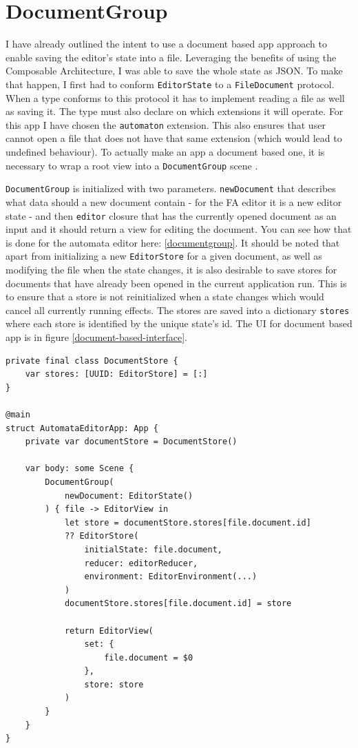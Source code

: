 \section{DocumentGroup}

I have already outlined the intent to use a document based app approach to enable saving the editor's state into a file. Leveraging the benefits of using the Composable Architecture, I was able to save the whole state as JSON. To make that happen, I first had to conform \lstinline{EditorState} to a \lstinline{FileDocument} protocol. When a type conforms to this protocol it has to implement reading a file as well as saving it. The type must also declare on which extensions it will operate. For this app I have chosen the \lstinline{automaton} extension. This also ensures that user cannot open a file that does not have that same extension (which would lead to undefined behaviour). To actually make an app a document based one, it is necessary to wrap a root view into a \lstinline{DocumentGroup} scene \cite{documentgroup}. 

\lstinline{DocumentGroup} is initialized with two parameters. \lstinline{newDocument} that describes what data should a new document contain - for the FA editor it is a new editor state - and then \lstinline{editor} closure that has the currently opened document as an input and it should return a view for editing the document. You can see how that is done for the automata editor here: \ref{documentgroup}. It should be noted that apart from initializing a new \lstinline{EditorStore} for a given document, as well as modifying the file when the state changes, it is also desirable to save stores for documents that have already been opened in the current application run. This is to ensure that a store is not reinitialized when a state changes which would cancel all currently running effects. The stores are saved into a dictionary \lstinline{stores} where each store is identified by the unique state's id. The UI for document based app is in figure \ref{document-based-interface}.

\begin{lstlisting}[caption={DocumentGroup scene}, label=documentgroup]
private final class DocumentStore {
    var stores: [UUID: EditorStore] = [:]
}

@main
struct AutomataEditorApp: App {
    private var documentStore = DocumentStore()
    
    var body: some Scene {
        DocumentGroup(
            newDocument: EditorState()
        ) { file -> EditorView in
            let store = documentStore.stores[file.document.id] 
            ?? EditorStore(
                initialState: file.document,
                reducer: editorReducer,
                environment: EditorEnvironment(...)
            )
            documentStore.stores[file.document.id] = store
            
            return EditorView(
                set: {
                    file.document = $0
                },
                store: store
            )
        }
    }
}
\end{lstlisting}

